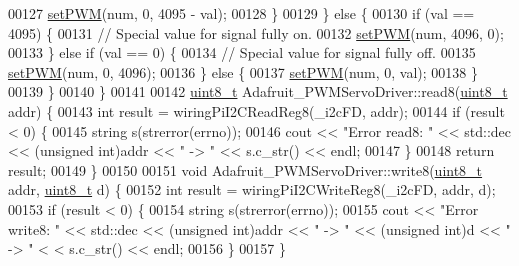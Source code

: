 \begin{DoxyCode}
00127             \hyperlink{classAdafruit__PWMServoDriver_a724a7fc39c6fba34478ecc0eea038bd3}{setPWM}(num, 0, 4095 - val);
00128         \}
00129     \} \textcolor{keywordflow}{else} \{
00130         \textcolor{keywordflow}{if} (val == 4095) \{
00131             \textcolor{comment}{// Special value for signal fully on.}
00132             \hyperlink{classAdafruit__PWMServoDriver_a724a7fc39c6fba34478ecc0eea038bd3}{setPWM}(num, 4096, 0);
00133         \} \textcolor{keywordflow}{else} \textcolor{keywordflow}{if} (val == 0) \{
00134             \textcolor{comment}{// Special value for signal fully off.}
00135             \hyperlink{classAdafruit__PWMServoDriver_a724a7fc39c6fba34478ecc0eea038bd3}{setPWM}(num, 0, 4096);
00136         \} \textcolor{keywordflow}{else} \{
00137             \hyperlink{classAdafruit__PWMServoDriver_a724a7fc39c6fba34478ecc0eea038bd3}{setPWM}(num, 0, val);
00138         \}
00139     \}
00140 \}
00141 
00142 \hyperlink{Adafruit__PWMServoDriver_8h_ab077fa1127453be2bd9d4c3c8a768fa7}{uint8\_t} Adafruit\_PWMServoDriver::read8(\hyperlink{Adafruit__PWMServoDriver_8h_ab077fa1127453be2bd9d4c3c8a768fa7}{uint8\_t} addr) \{
00143     \textcolor{keywordtype}{int} result = wiringPiI2CReadReg8(\_i2cFD, addr);
00144     \textcolor{keywordflow}{if} (result < 0) \{
00145         \textcolor{keywordtype}{string} s(strerror(errno));
00146         cout << \textcolor{stringliteral}{"Error read8: "} << std::dec << (\textcolor{keywordtype}{unsigned} int)addr << \textcolor{stringliteral}{" -> "} << s.c\_str() << endl;
00147     \}
00148     \textcolor{keywordflow}{return} result;
00149 \}
00150 
00151 \textcolor{keywordtype}{void} Adafruit\_PWMServoDriver::write8(\hyperlink{Adafruit__PWMServoDriver_8h_ab077fa1127453be2bd9d4c3c8a768fa7}{uint8\_t} addr, \hyperlink{Adafruit__PWMServoDriver_8h_ab077fa1127453be2bd9d4c3c8a768fa7}{uint8\_t} d) \{
00152     \textcolor{keywordtype}{int} result = wiringPiI2CWriteReg8(\_i2cFD, addr, d);
00153     \textcolor{keywordflow}{if} (result < 0) \{
00154         \textcolor{keywordtype}{string} s(strerror(errno));
00155         cout << \textcolor{stringliteral}{"Error write8: "} << std::dec << (\textcolor{keywordtype}{unsigned} int)addr << \textcolor{stringliteral}{" -> "} << (\textcolor{keywordtype}{unsigned} \textcolor{keywordtype}{int})d << \textcolor{stringliteral}{" -> "} <
      < s.c\_str() << endl;
00156     \}
00157 \}
\end{DoxyCode}
